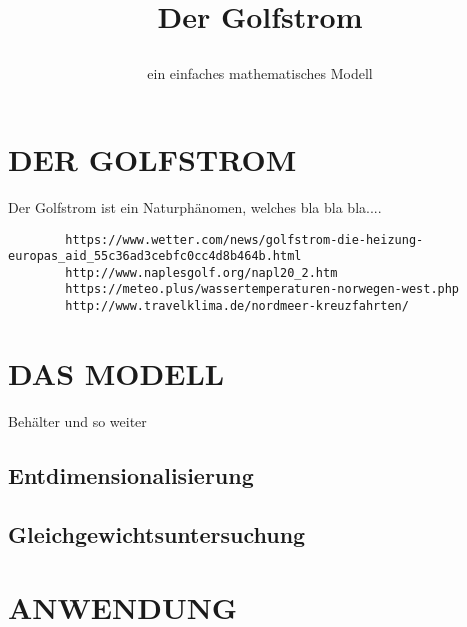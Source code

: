 \documentclass[a4paper,twoside]{article}
\begin{document}
	\title{Der Golfstrom\subtitle{ein einfaches mathematisches Modell} }
	
	\author{}
	

	
	\onecolumn \maketitle \normalsize \vfill

	\section{\uppercase{Der Golfstrom}}\label{sec:Golfstrom}

	\noindent Der Golfstrom ist ein Naturphänomen, welches bla bla bla....
	\begin{verbatim}
	 	https://www.wetter.com/news/golfstrom-die-heizung-europas_aid_55c36ad3cebfc0cc4d8b464b.html
	 	http://www.naplesgolf.org/napl20_2.htm
	 	https://meteo.plus/wassertemperaturen-norwegen-west.php
	 	http://www.travelklima.de/nordmeer-kreuzfahrten/
	\end{verbatim}
	
	\section{\uppercase{Das Modell}}\label{sec:Modell}
	
	\noindent Behälter und so weiter
	
	\subsection{Entdimensionalisierung}
	
	\subsection{Gleichgewichtsuntersuchung}
	
	\section{\uppercase{Anwendung}}\label{sec:Anwendung}
	
\end{document}
